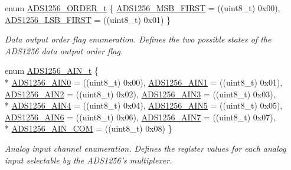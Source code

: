 \begin{DoxyCompactItemize}
enum \hyperlink{group__ads1256__driver_ga3615e2e1ba70971dcdd5f7e54ffe5606}{A\-D\-S1256\-\_\-\-O\-R\-D\-E\-R\-\_\-t} \{ \hyperlink{group__ads1256__driver_gga3615e2e1ba70971dcdd5f7e54ffe5606ad87274f158f6a5534bb84cb4c75ac3e7}{A\-D\-S1256\-\_\-\-M\-S\-B\-\_\-\-F\-I\-R\-S\-T} = ((uint8\-\_\-t) 0x00), 
\hyperlink{group__ads1256__driver_gga3615e2e1ba70971dcdd5f7e54ffe5606a1ec7c8b9391d0c09ca557ad0c5aab861}{A\-D\-S1256\-\_\-\-L\-S\-B\-\_\-\-F\-I\-R\-S\-T} = ((uint8\-\_\-t) 0x01)
 \}
\begin{DoxyCompactList}\small\item\em Data output order flag enumeration. Defines the two possible states of the A\-D\-S1256 data output order flag. \end{DoxyCompactList}\item 
enum \hyperlink{group__ads1256__driver_ga7eac069c538033668b7baeca198def8f}{A\-D\-S1256\-\_\-\-A\-I\-N\-\_\-t} \{ \\*
\hyperlink{group__ads1256__driver_gga7eac069c538033668b7baeca198def8fa47239a420bad562940da8a369ba7ef02}{A\-D\-S1256\-\_\-\-A\-I\-N0} = ((uint8\-\_\-t) 0x00), 
\hyperlink{group__ads1256__driver_gga7eac069c538033668b7baeca198def8fa20686f8f3555bdf3074706ea7a0dbf56}{A\-D\-S1256\-\_\-\-A\-I\-N1} = ((uint8\-\_\-t) 0x01), 
\hyperlink{group__ads1256__driver_gga7eac069c538033668b7baeca198def8fab4bbf5219baf9f5eadad4f04f97b7226}{A\-D\-S1256\-\_\-\-A\-I\-N2} = ((uint8\-\_\-t) 0x02), 
\hyperlink{group__ads1256__driver_gga7eac069c538033668b7baeca198def8fa7517493ec2ddb093570dea22b2adc827}{A\-D\-S1256\-\_\-\-A\-I\-N3} = ((uint8\-\_\-t) 0x03), 
\\*
\hyperlink{group__ads1256__driver_gga7eac069c538033668b7baeca198def8faf4eebd8a33f7e323adb2a7c6cb1c0097}{A\-D\-S1256\-\_\-\-A\-I\-N4} = ((uint8\-\_\-t) 0x04), 
\hyperlink{group__ads1256__driver_gga7eac069c538033668b7baeca198def8fa8aab4ff09924f28f86c95871f3a7469b}{A\-D\-S1256\-\_\-\-A\-I\-N5} = ((uint8\-\_\-t) 0x05), 
\hyperlink{group__ads1256__driver_gga7eac069c538033668b7baeca198def8fa3759a4dbba9fcbb227181834597784c3}{A\-D\-S1256\-\_\-\-A\-I\-N6} = ((uint8\-\_\-t) 0x06), 
\hyperlink{group__ads1256__driver_gga7eac069c538033668b7baeca198def8fa8fea766eea050739d6fbc1718f2a9d72}{A\-D\-S1256\-\_\-\-A\-I\-N7} = ((uint8\-\_\-t) 0x07), 
\\*
\hyperlink{group__ads1256__driver_gga7eac069c538033668b7baeca198def8fada4ab8d72cb9bd115ba94655dd0ff0c1}{A\-D\-S1256\-\_\-\-A\-I\-N\-\_\-\-C\-O\-M} = ((uint8\-\_\-t) 0x08)
 \}
\begin{DoxyCompactList}\small\item\em Analog input channel enumeration. Defines the register values for each analog input selectable by the A\-D\-S1256's multiplexer. \end{DoxyCompactList}\item 

\end{DoxyCompactItemize}

